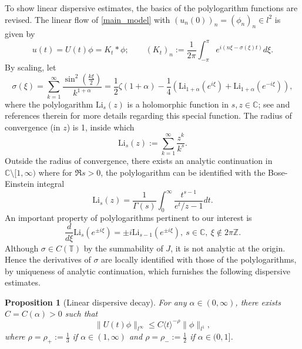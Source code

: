 \documentclass{article}
\numberwithin{equation}{section}
\newtheorem{proposition}{Proposition}[section]
\begin{document}
To show linear dispersive estimates, the basics of the polylogarithm functions are revised. The linear flow of \eqref{main_model} with $(u_n(0))_n = (\phi_n)_n \in l^2$ is given by
\begin{equation}\label{kt}
    u(t) = U(t) \phi = K_{t} \ast \phi;\qquad (K_t)_n := \frac{1}{2\pi} \int_{-\pi}^{\pi} e^{i (n \xi-\sigma(\xi)t)}d\xi.
\end{equation}
By scaling, let
\begin{equation*}
    \sigma(\xi) = \sum_{k=1}^\infty \frac{\sin^2\left(\frac{k\xi}{2}\right)}{k^{1+\alpha}} = \frac{1}{2}\zeta(1+\alpha) - \frac{1}{4}(\mathrm{Li}_{1+\alpha}(e^{i\xi}) + \mathrm{Li}_{1+\alpha}(e^{-i\xi})),
\end{equation*}
where the polylogarithm $\mathrm{Li}_s(z)$ is a holomorphic function in $s,z \in \mathbb{C}$; see \cite{NIST:DLMF} and references therein for more details regarding this special function. The radius of convergence (in $z$) is 1, inside which
\begin{equation*}
    \mathrm{Li}_s(z) := \sum_{k=1}^\infty \frac{z^k}{k^s}.
\end{equation*}
Outside the radius of convergence, there exists an analytic continuation in $\mathbb{C} \setminus [1,\infty)$ where for $\Re s>0$, the polylogarithm can be identified with the Bose-Einstein integral
\begin{equation}\label{bose_einstein}
    \mathrm{Li}_s(z) = \frac{1}{\Gamma(s)} \int_0^\infty \frac{t^{s-1}}{e^t/z - 1} dt.
\end{equation}
An important property of polylogarithms pertinent to our interest is
\begin{equation}\label{derivative}
    \frac{d}{d\xi} \mathrm{Li}_s(e^{\pm i \xi}) = \pm i \mathrm{Li}_{s-1}(e^{\pm i \xi}),\ s \in \mathbb{C},\ \xi \notin 2\pi \mathbb{Z}.
\end{equation}
Although $\sigma \in C(\mathbb{T})$ by the summability of $J$, it is not analytic at the origin. Hence the derivatives of $\sigma$ are locally identified with those of the polylogarithms, by uniqueness of analytic continuation, which furnishes the following dispersive estimates.


\begin{proposition}[Linear dispersive decay]\label{p5}
    For any $\alpha \in (0,\infty)$, there exists $C = C(\alpha) > 0$ such that
    \begin{equation}\label{dispersive_estimate}
        \| U(t) \phi \|_{l^\infty} \leq C \langle t \rangle^{-\rho}\| \phi \|_{l^1},
    \end{equation}
    where $\rho = \rho_+:=\frac{1}{3}$ if $\alpha \in (1,\infty)$ and $\rho = \rho_{-}:=\frac{1}{2}$ if $\alpha \in (0,1]$.    
\end{proposition}
\end{document}
